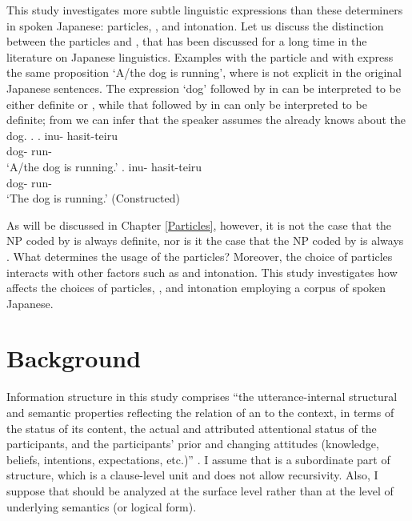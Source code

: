 This study investigates more subtle linguistic expressions than these determiners in spoken Japanese:
particles, , and intonation.
Let us discuss
the distinction between the particles  and ,
that has been discussed for a long time in the literature on Japanese linguistics.
Examples \Next[a] with the particle  and \Next[b] with 
express the same proposition `A/the dog is running',
where  is not explicit in the original Japanese sentences.
The expression  `dog' followed by  in \Next[a]
can be interpreted to be either definite or ,
while that followed by  in \Next[b]
can only be interpreted to be definite;
from \Next[b] we can infer that the speaker assumes the  already knows about the dog.
%
\ex.
 \ag. inu- hasit-teiru \\
      dog- run- \\
      `A/the dog is running.'
 \bg. inu- hasit-teiru \\
      dog- run- \\
      `The dog is running.'
 \hfill{(Constructed)}

As will be discussed in Chapter \ref{Particles},
however,
it is not the case that
the NP coded by  is always definite,
nor is it the case that
the NP coded by  is always .
What determines the usage of the particles?
Moreover,
the choice of particles interacts with other factors such as
 and intonation.
This study investigates how  affects
the choices of particles, , and intonation
employing a corpus of spoken Japanese.

\section{Background}\label{IntroBackground}

Information structure in this study comprises
``the utterance-internal structural and semantic properties reflecting the relation of an  to the  context,
in terms of the  status of its content,
the actual and attributed attentional status of the  participants,
and the participants' prior and changing attitudes
(knowledge, beliefs, intentions, expectations, etc.)''
\cite[250]{kruijff-korbayovasteedman03}.
I assume that
 is a subordinate part of  structure,
which is a clause-level unit and does not allow recursivity.
Also, I suppose that  should be analyzed at the surface level rather than at the level of underlying semantics (or logical form).

